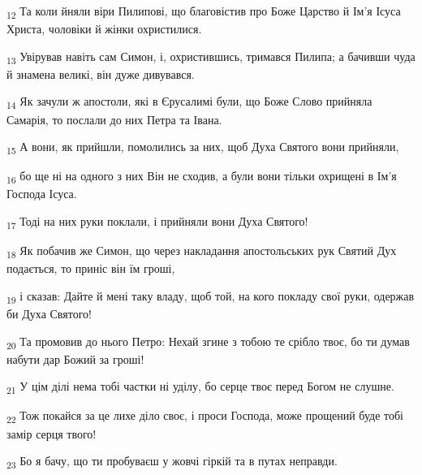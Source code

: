 \begin{tcolorbox}
\textsubscript{12} Та коли йняли віри Пилипові, що благовістив про Боже Царство й Ім'я Ісуса Христа, чоловіки й жінки охристилися.
\end{tcolorbox}
\begin{tcolorbox}
\textsubscript{13} Увірував навіть сам Симон, і, охристившись, тримався Пилипа; а бачивши чуда й знамена великі, він дуже дивувався.
\end{tcolorbox}
\begin{tcolorbox}
\textsubscript{14} Як зачули ж апостоли, які в Єрусалимі були, що Боже Слово прийняла Самарія, то послали до них Петра та Івана.
\end{tcolorbox}
\begin{tcolorbox}
\textsubscript{15} А вони, як прийшли, помолились за них, щоб Духа Святого вони прийняли,
\end{tcolorbox}
\begin{tcolorbox}
\textsubscript{16} бо ще ні на одного з них Він не сходив, а були вони тільки охрищені в Ім'я Господа Ісуса.
\end{tcolorbox}
\begin{tcolorbox}
\textsubscript{17} Тоді на них руки поклали, і прийняли вони Духа Святого!
\end{tcolorbox}
\begin{tcolorbox}
\textsubscript{18} Як побачив же Симон, що через накладання апостольських рук Святий Дух подається, то приніс він їм гроші,
\end{tcolorbox}
\begin{tcolorbox}
\textsubscript{19} і сказав: Дайте й мені таку владу, щоб той, на кого покладу свої руки, одержав би Духа Святого!
\end{tcolorbox}
\begin{tcolorbox}
\textsubscript{20} Та промовив до нього Петро: Нехай згине з тобою те срібло твоє, бо ти думав набути дар Божий за гроші!
\end{tcolorbox}
\begin{tcolorbox}
\textsubscript{21} У цім ділі нема тобі частки ні уділу, бо серце твоє перед Богом не слушне.
\end{tcolorbox}
\begin{tcolorbox}
\textsubscript{22} Тож покайся за це лихе діло своє, і проси Господа, може прощений буде тобі замір серця твого!
\end{tcolorbox}
\begin{tcolorbox}
\textsubscript{23} Бо я бачу, що ти пробуваєш у жовчі гіркій та в путах неправди.
\end{tcolorbox}
